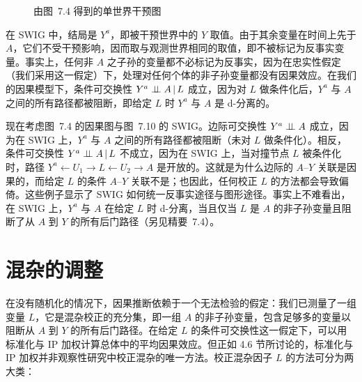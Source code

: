 \begin{figure}[htbp]
\centering
{}
\caption{由图~7.4 得到的单世界干预图}
\label{fig:7.10}
\end{figure}

在 SWIG 中，结局是 $Y^{a}$，即被干预世界中的 $Y$ 取值。由于其余变量在时间上先于 $A$，它们不受干预影响，因而取与观测世界相同的取值，即不被标记为反事实变量。事实上，任何非 $A$ 之子孙的变量都不必标记为反事实，因为在忠实性假定（我们采用这一假定）下，处理对任何个体的非子孙变量都没有因果效应。在我们的因果模型下，条件可交换性 $Y^{a}\perp\!\!\!\perp A\,|\, L$ 成立，因为对 $L$ 做条件化后，$Y^{a}$ 与 $A$ 之间的所有路径都被阻断，即给定 $L$ 时 $Y^{a}$ 与 $A$ 是 d-分离的。

现在考虑图~7.4 的因果图与图~7.10 的 SWIG。边际可交换性 $Y^{a}\perp\!\!\!\perp A$ 成立，因为在 SWIG 上，$Y^{a}$ 与 $A$ 之间的所有路径都被阻断（未对 $L$ 做条件化）。相反，条件可交换性 $Y^{a}\perp\!\!\!\perp A\,|\, L$ 不成立，因为在 SWIG 上，当对撞节点 $L$ 被条件化时，路径 $Y^{a}\leftarrow U_1\to L\leftarrow U_2\to A$ 是开放的。这就是为什么边际的 $A$–$Y$ 关联是因果的，而给定 $L$ 的条件 $A$–$Y$ 关联不是；也因此，任何校正 $L$ 的方法都会导致偏倚。这些例子显示了 SWIG 如何统一反事实途径与图形途径。事实上不难看出，在 SWIG 上，$Y^{a}$ 与 $A$ 在给定 $L$ 时 d-分离，当且仅当 $L$ 是 $A$ 的非子孙变量且阻断了从 $A$ 到 $Y$ 的所有后门路径（另见精要~7.4）。

\section{混杂的调整}

在没有随机化的情况下，因果推断依赖于一个无法检验的假定：我们已测量了一组变量 $L$，它是混杂校正的充分集，即一组 $A$ 的非子孙变量，包含足够多的变量以阻断从 $A$ 到 $Y$ 的所有后门路径。在给定 $L$ 的条件可交换性这一假定下，可以用标准化与 IP 加权计算总体中的平均因果效应。但正如 4.6 节所讨论的，标准化与 IP 加权并非观察性研究中校正混杂的唯一方法。校正混杂因子 $L$ 的方法可分为两大类：

